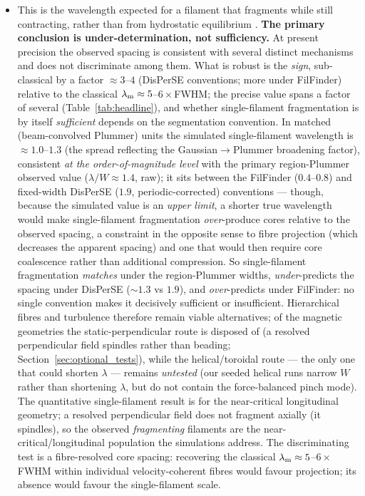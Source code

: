 \documentclass[usenatbib,twoside,twocolumn]{mnras}
\begin{document}
\begin{itemize}
\begin{itemize}
        \item This is the wavelength expected for a filament that fragments while still contracting, rather than from hydrostatic equilibrium \citep{Clarke2016}. \textbf{The primary conclusion is under-determination, not sufficiency.} At present precision the observed spacing is consistent with several distinct mechanisms and does not discriminate among them. What is robust is the \emph{sign}, sub-classical by a factor $\approx3$--$4$ (DisPerSE conventions; more under FilFinder) relative to the classical $\lambda_{\rm m}\approx5$--$6\times$FWHM; the precise value spans a factor of several (Table~\ref{tab:headline}), and whether single-filament fragmentation is by itself \emph{sufficient} depends on the segmentation convention. In matched (beam-convolved Plummer) units the simulated single-filament wavelength is $\approx1.0$--$1.3$ (the spread reflecting the Gaussian$\to$Plummer broadening factor), consistent \emph{at the order-of-magnitude level} with the primary region-Plummer observed value ($\lambda/W\approx1.4$, raw); it sits between the FilFinder ($0.4$--$0.8$) and fixed-width DisPerSE ($1.9$, periodic-corrected) conventions --- though, because the simulated value is an \emph{upper limit}, a shorter true wavelength would make single-filament fragmentation \emph{over}-produce cores relative to the observed spacing, a constraint in the opposite sense to fibre projection (which decreases the apparent spacing) and one that would then require core coalescence rather than additional compression. So single-filament fragmentation \emph{matches} under the region-Plummer widths, \emph{under}-predicts the spacing under DisPerSE ($\sim1.3$ vs $1.9$), and \emph{over}-predicts under FilFinder: no single convention makes it decisively sufficient or insufficient. Hierarchical fibres and turbulence therefore remain viable alternatives; of the magnetic geometries the static-perpendicular route is disposed of (a resolved perpendicular field spindles rather than beading; Section~\ref{sec:optional_tests}), while the helical/toroidal route --- the only one that could shorten $\lambda$ --- remains \emph{untested} (our seeded helical runs narrow $W$ rather than shortening $\lambda$, but do not contain the force-balanced \citet{Fiege2000} pinch mode). The quantitative single-filament result is for the near-critical longitudinal geometry; a resolved perpendicular field does not fragment axially (it spindles), so the observed \emph{fragmenting} filaments are the near-critical/longitudinal population the simulations address. The discriminating test is a fibre-resolved core spacing: recovering the classical $\lambda_{\rm m}\approx5$--$6\times$FWHM within individual velocity-coherent fibres would favour projection; its absence would favour the single-filament scale.
    \end{itemize}


\end{itemize}
\end{document}
